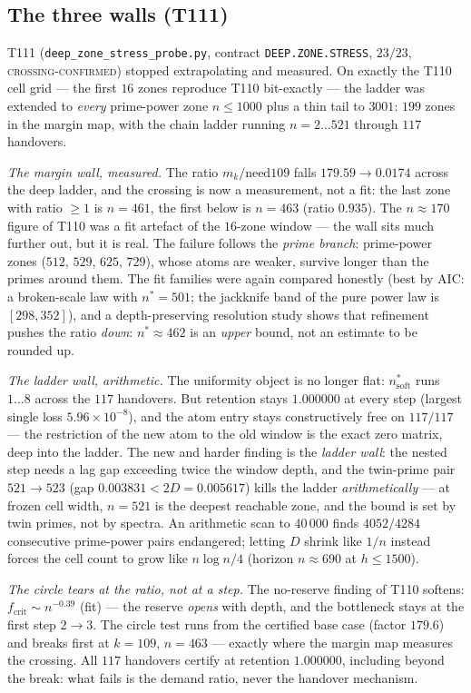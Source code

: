 \documentclass[11pt,a4paper]{article}
\begin{document}
\subsection{The three walls (T111)}
T111 (\texttt{deep\_zone\_stress\_probe.py}, contract \texttt{DEEP.ZONE.STRESS}, $23/23$,
\textsc{crossing-confirmed}) stopped extrapolating and measured. On exactly the T110 cell grid ---
the first $16$ zones reproduce T110 bit-exactly --- the ladder was extended to \emph{every}
prime-power zone $n\le1000$ plus a thin tail to $3001$: $199$ zones in the margin map, with the
chain ladder running $n=2\ldots521$ through $117$ handovers.

\emph{The margin wall, measured.} The ratio $m_k/\mathrm{need109}$ falls $179.59\to0.0174$ across
the deep ladder, and the crossing is now a measurement, not a fit: the last zone with ratio $\ge1$
is $n=461$, the first below is $n=463$ (ratio $0.935$). The $n\approx170$ figure of T110 was a fit
artefact of the $16$-zone window --- the wall sits much further out, but it is real. The failure
follows the \emph{prime branch}: prime-power zones ($512$, $529$, $625$, $729$), whose atoms are
weaker, survive longer than the primes around them. The fit families were again compared honestly
(best by AIC: a broken-scale law with $n^*=501$; the jackknife band of the pure power law is
$[298,352]$), and a depth-preserving resolution study shows that refinement pushes the ratio
\emph{down}: $n^*\approx462$ is an \emph{upper} bound, not an estimate to be rounded up.

\emph{The ladder wall, arithmetic.} The uniformity object is no longer flat: $n^*_{\mathrm{soft}}$
runs $1\ldots8$ across the $117$ handovers. But retention stays $1.000000$ at every step (largest
single loss $5.96\times10^{-8}$), and the atom entry stays constructively free on $117/117$ --- the
restriction of the new atom to the old window is the exact zero matrix, deep into the ladder. The
new and harder finding is the \emph{ladder wall}: the nested step needs a lag gap exceeding twice
the window depth, and the twin-prime pair $521\to523$ (gap $0.003831<2D=0.005617$) kills the ladder
\emph{arithmetically} --- at frozen cell width, $n=521$ is the deepest reachable zone, and the bound
is set by twin primes, not by spectra. An arithmetic scan to $40\,000$ finds $4052/4284$
consecutive prime-power pairs endangered; letting $D$ shrink like $1/n$ instead forces the cell
count to grow like $n\log n/4$ (horizon $n\approx690$ at $h\le1500$).

\emph{The circle tears at the ratio, not at a step.} The no-reserve finding of T110 softens:
$f_{\mathrm{crit}}\sim n^{-0.39}$ (fit) --- the reserve \emph{opens} with depth, and the bottleneck
stays at the first step $2\to3$. The circle test runs from the certified base case (factor $179.6$)
and breaks first at $k=109$, $n=463$ --- exactly where the margin map measures the crossing. All
$117$ handovers certify at retention $1.000000$, including beyond the break: what fails is the
demand ratio, never the handover mechanism.
\end{document}

